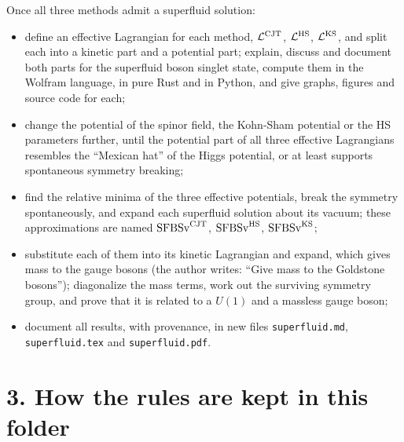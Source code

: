 \documentclass[
  10pt,
]{article}
\providecommand{\tightlist}{%
  \setlength{\itemsep}{0pt}\setlength{\parskip}{0pt}}
\begin{document}
Once all three methods admit a superfluid solution:

\begin{itemize}
\tightlist
\item
  define an effective Lagrangian for each method,
  \(\mathcal L^{\rm CJT}\), \(\mathcal L^{\rm HS}\),
  \(\mathcal L^{\rm KS}\), and split each into a kinetic part and a
  potential part; explain, discuss and document both parts for the
  superfluid boson singlet state, compute them in the Wolfram language,
  in pure Rust and in Python, and give graphs, figures and source code
  for each;
\item
  change the potential of the spinor field, the Kohn-Sham potential or
  the HS parameters further, until the potential part of all three
  effective Lagrangians resembles the ``Mexican hat'' of the Higgs
  potential, or at least supports spontaneous symmetry breaking;
\item
  find the relative minima of the three effective potentials, break the
  symmetry spontaneously, and expand each superfluid solution about its
  vacuum; these approximations are named \(\mathrm{SFBSv}^{\rm CJT}\),
  \(\mathrm{SFBSv}^{\rm HS}\), \(\mathrm{SFBSv}^{\rm KS}\);
\item
  substitute each of them into its kinetic Lagrangian and expand, which
  gives mass to the gauge bosons (the author writes: ``Give mass to the
  Goldstone bosons''); diagonalize the mass terms, work out the
  surviving symmetry group, and prove that it is related to a \(U(1)\)
  and a massless gauge boson;
\item
  document all results, with provenance, in new files
  \texttt{superfluid.md}, \texttt{superfluid.tex} and
  \texttt{superfluid.pdf}.
\end{itemize}

\hypertarget{how-the-rules-are-kept-in-this-folder}{%
\section{3. How the rules are kept in this
folder}\label{how-the-rules-are-kept-in-this-folder}}
\end{document}

